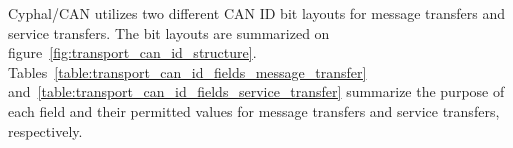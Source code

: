 Cyphal/CAN utilizes two different CAN ID bit layouts for message transfers and service transfers.
The bit layouts are summarized on figure~\ref{fig:transport_can_id_structure}.
Tables~\ref{table:transport_can_id_fields_message_transfer} and~\ref{table:transport_can_id_fields_service_transfer}
summarize the purpose of each field and their permitted values
for message transfers and service transfers, respectively.

\begin{figure}[H]
    \centering
\end{figure}
